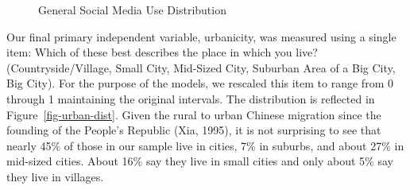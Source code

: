 \documentclass[
  letterpaper,
  DIV=11,
  numbers=noendperiod]{scrartcl}
\begin{document}
\begin{figure}


\caption{\label{fig-sm-use-dist}General Social Media Use Distribution}

\end{figure}%

Our final primary independent variable, urbanicity, was measured using a
single item: Which of these best describes the place in which you live?
(Countryside/Village, Small City, Mid-Sized City, Suburban Area of a Big
City, Big City). For the purpose of the models, we rescaled this item to
range from 0 through 1 maintaining the original intervals. The
distribution is reflected in Figure~\ref{fig-urban-dist}. Given the
rural to urban Chinese migration since the founding of the People's
Republic (Xia, 1995), it is not surprising to see that nearly 45\% of
those in our sample live in cities, 7\% in suburbs, and about 27\% in
mid-sized cities. About 16\% say they live in small cities and only
about 5\% say they live in villages.
\end{document}
